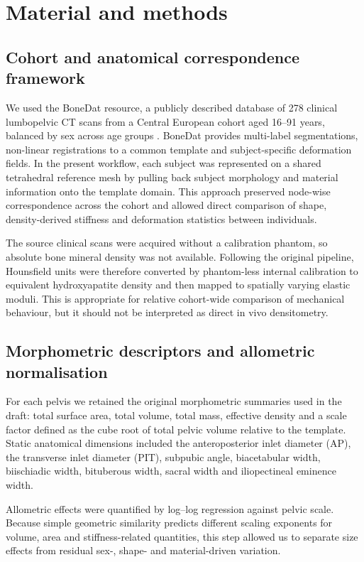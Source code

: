\documentclass[11pt,a4paper]{article}
\begin{document}
\section{Material and methods}

\subsection{Cohort and anatomical correspondence framework}

We used the BoneDat resource, a publicly described database of 278 clinical lumbopelvic CT scans from a Central European cohort aged 16--91 years, balanced by sex across age groups \citep{HenysKuchar2025}. BoneDat provides multi-label segmentations, non-linear registrations to a common template and subject-specific deformation fields. In the present workflow, each subject was represented on a shared tetrahedral reference mesh by pulling back subject morphology and material information onto the template domain. This approach preserved node-wise correspondence across the cohort and allowed direct comparison of shape, density-derived stiffness and deformation statistics between individuals.

The source clinical scans were acquired without a calibration phantom, so absolute bone mineral density was not available. Following the original pipeline, Hounsfield units were therefore converted by phantom-less internal calibration to equivalent hydroxyapatite density and then mapped to spatially varying elastic moduli. This is appropriate for relative cohort-wide comparison of mechanical behaviour, but it should not be interpreted as direct in vivo densitometry.

\subsection{Morphometric descriptors and allometric normalisation}

For each pelvis we retained the original morphometric summaries used in the draft: total surface area, total volume, total mass, effective density and a scale factor defined as the cube root of total pelvic volume relative to the template. Static anatomical dimensions included the anteroposterior inlet diameter (AP), the transverse inlet diameter (PIT), subpubic angle, biacetabular width, biischiadic width, bituberous width, sacral width and iliopectineal eminence width.

Allometric effects were quantified by log--log regression against pelvic scale. Because simple geometric similarity predicts different scaling exponents for volume, area and stiffness-related quantities, this step allowed us to separate size effects from residual sex-, shape- and material-driven variation.
\end{document}
